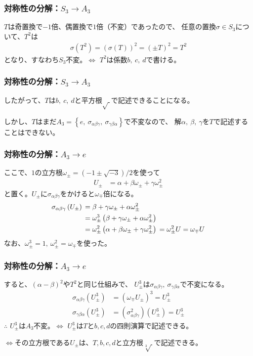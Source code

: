 \documentclass[12pt, t]{beamer}
\newcommand{\lr}[1]{\left({}#1\right){}}
\newcommand{\clr}[1]{\left\{{}#1\right\}{}}
\begin{document}
\begin{frame}
\frametitle{対称性の分解：$S_3 \rightarrow A_3$}
$T$は奇置換で$-1$倍、偶置換で$1$倍（不変）であったので、
任意の置換$\sigma \in S_3$について、$T^2$は
\begin{align}
  \sigma(T^2) = (\sigma(T))^2 = (\pm T)^2 = T^2
\end{align}
となり、すなわち$S_3$不変。$\Leftrightarrow$ $T^2$は係数$b,\ c,\ d$で書ける。
\end{frame}

\begin{frame}
\frametitle{対称性の分解：$S_3 \rightarrow A_3$}
したがって、$T$は$b,\ c,\ d$と平方根$\sqrt{\ }$で記述できることになる。

しかし、$T$はまだ$A_3 = \clr{e,\ \sigma_{\alpha \beta \gamma},\ \sigma_{\gamma \beta \alpha}}$で不変なので、
解$\alpha,\ \beta,\ \gamma$を$T$で記述することはできない。
\end{frame}

\begin{frame}
\frametitle{対称性の分解：$A_3 \rightarrow e$}
ここで、$1$の立方根$\omega_{\pm} = (-1 \pm \sqrt{-3})/2$を使って
\begin{align}
  U_{\pm} &= \alpha + \beta \omega_{\pm} + \gamma \omega_{\pm}^2
\end{align}
と置く。$U_{\pm}$に$\sigma_{\alpha \beta \gamma}$をかけると$\omega_{\mp}$倍になる。
\begin{align}
  \sigma_{\alpha \beta \gamma}\lr{U_{\pm}} &= \beta + \gamma \omega_{\pm} + \alpha \omega_{\pm}^2 \notag \\
                                     &= \omega_{\pm}^3 \lr{\beta + \gamma \omega_{\pm} + \alpha \omega_{\pm}^2} \notag \\
                                     &= \omega_{\pm}^2 \lr{\alpha + \beta \omega_{\pm} + \gamma \omega_{\pm}^2} = \omega_{\pm}^2 U = \omega_{\mp} U
\end{align}
なお、$\omega_\pm^3 = 1,\ \omega_\pm^2 = \omega_{\mp}$を使った。
\end{frame}

\begin{frame}
\frametitle{対称性の分解：$A_3 \rightarrow e$}
すると、$(\alpha - \beta)^2$や$T^2$と同じ仕組みで、
$U_{\pm}^3$は$\sigma_{\alpha \beta \gamma},\ \sigma_{\gamma \beta \alpha}$で不変になる。
\begin{align}
  \sigma_{\alpha \beta \gamma} \lr{U_{\pm}^3} &= (\omega_{\mp} U_{\pm})^3 = U_{\pm}^3 \\
  \sigma_{\gamma \beta \alpha} \lr{U_{\pm}^3} &= \lr{\sigma_{\alpha \beta \gamma}^2}\lr{U_{\pm}^3} = U_{\pm}^3
\end{align}
$\therefore$ $U_{\pm}^3$は$A_3$不変。$\Leftrightarrow$ $U_{\pm}^3$は$T$と$b, c, d$の四則演算で記述できる。

$\Leftrightarrow$その立方根である$U_{\pm}$は、$T, b, c, d$と立方根$\sqrt[3]{\ }$で記述できる。
\end{frame}
\end{document}
